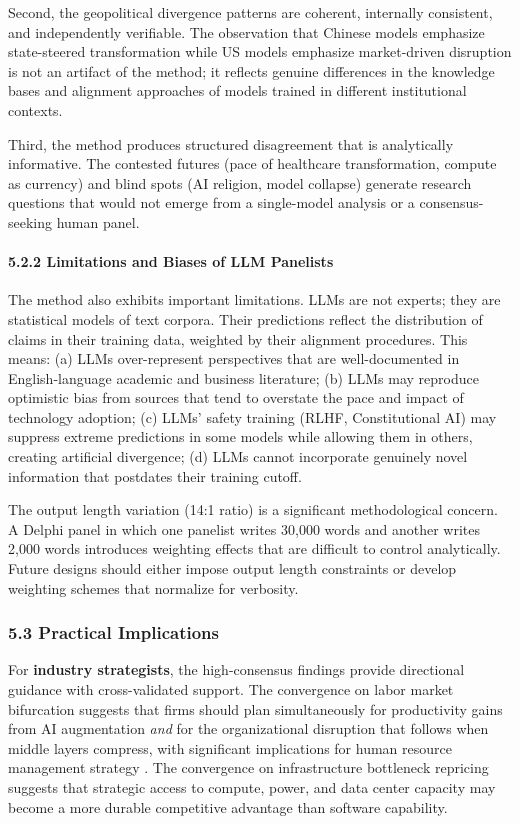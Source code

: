 \documentclass{article}
\begin{document}
Second, the geopolitical divergence patterns are coherent, internally consistent, and independently verifiable. The observation that Chinese models emphasize state-steered transformation while US models emphasize market-driven disruption is not an artifact of the method; it reflects genuine differences in the knowledge bases and alignment approaches of models trained in different institutional contexts.

Third, the method produces structured disagreement that is analytically informative. The contested futures (pace of healthcare transformation, compute as currency) and blind spots (AI religion, model collapse) generate research questions that would not emerge from a single-model analysis or a consensus-seeking human panel.


\paragraph{5.2.2 Limitations and Biases of LLM Panelists}

The method also exhibits important limitations. LLMs are not experts; they are statistical models of text corpora. Their predictions reflect the distribution of claims in their training data, weighted by their alignment procedures. This means: (a) LLMs over-represent perspectives that are well-documented in English-language academic and business literature; (b) LLMs may reproduce optimistic bias from sources that tend to overstate the pace and impact of technology adoption; (c) LLMs' safety training (RLHF, Constitutional AI) may suppress extreme predictions in some models while allowing them in others, creating artificial divergence; (d) LLMs cannot incorporate genuinely novel information that postdates their training cutoff.

The output length variation (14:1 ratio) is a significant methodological concern. A Delphi panel in which one panelist writes 30,000 words and another writes 2,000 words introduces weighting effects that are difficult to control analytically. Future designs should either impose output length constraints or develop weighting schemes that normalize for verbosity.


\subsubsection{5.3 Practical Implications}
\label{sec:5_3_practical_implications}

For \textbf{industry strategists}, the high-consensus findings provide directional guidance with cross-validated support. The convergence on labor market bifurcation suggests that firms should plan simultaneously for productivity gains from AI augmentation \textit{and} for the organizational disruption that follows when middle layers compress, with significant implications for human resource management strategy \citep{budhwar2023hrm}. The convergence on infrastructure bottleneck repricing suggests that strategic access to compute, power, and data center capacity may become a more durable competitive advantage than software capability.
\end{document}

